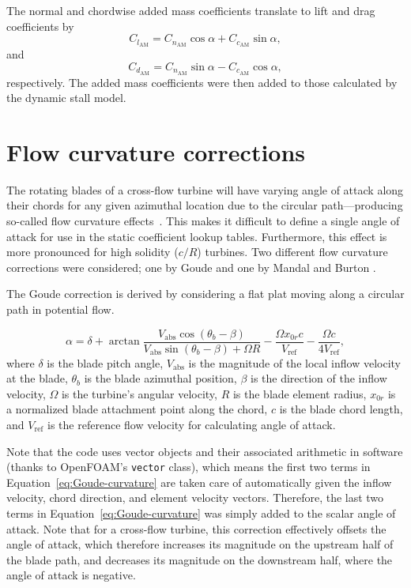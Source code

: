 The normal and chordwise added mass coefficients translate to lift and drag
coefficients by
\begin{equation}
    C_{l_\mathrm{AM}} = C_{n_\mathrm{AM}} \cos \alpha + C_{c_\mathrm{AM}} \sin
    \alpha,
\end{equation}
and
\begin{equation}
    C_{d_\mathrm{AM}} = C_{n_\mathrm{AM}} \sin \alpha - C_{c_\mathrm{AM}} \cos
    \alpha,
\end{equation}
respectively. The added mass coefficients were then added to those calculated by
the dynamic stall model.


\section{Flow curvature corrections}

The rotating blades of a cross-flow turbine will have varying angle of attack
along their chords for any given azimuthal location due to the circular
path---producing so-called flow curvature effects~\cite{Migliore1980}. This
makes it difficult to define a single angle of attack for use in the static
coefficient lookup tables. Furthermore, this effect is more pronounced for high
solidity ($c/R$) turbines. Two different flow curvature corrections were
considered; one by Goude \cite{Goude2012} and one by Mandal and Burton
\cite{Mandal1994}.

The Goude correction is derived by considering a flat plat moving along a
circular path in potential flow.

\begin{equation}
    \alpha = \delta + \arctan \frac{V_\mathrm{abs} \cos(\theta_b -
        \beta)}{V_\mathrm{abs} \sin(\theta_b - \beta) + \Omega R} - \frac{\Omega
        x_{0r}c}{V_\mathrm{ref}} - \frac{\Omega c}{4 V_\mathrm{ref}},
    \label{eq:Goude-curvature}
\end{equation}
where $\delta$ is the blade pitch angle, $V_\mathrm{abs}$ is the magnitude of
the local inflow velocity at the blade, $\theta_b$ is the blade azimuthal
position, $\beta$ is the direction of the inflow velocity, $\Omega$ is the
turbine's angular velocity, $R$ is the blade element radius, $x_{0r}$ is a
normalized blade attachment point along the chord, $c$ is the blade chord
length, and $V_\mathrm{ref}$ is the reference flow velocity for calculating
angle of attack.

Note that the code uses vector objects and their associated arithmetic in
software (thanks to OpenFOAM's \texttt{vector} class), which means the first two
terms in Equation~\ref{eq:Goude-curvature} are taken care of automatically given
the inflow velocity, chord direction, and element velocity vectors. Therefore,
the last two terms in Equation~\ref{eq:Goude-curvature} was simply added to the
scalar angle of attack. Note that for a cross-flow turbine, this correction
effectively offsets the angle of attack, which therefore increases its magnitude
on the upstream half of the blade path, and decreases its magnitude on the
downstream half, where the angle of attack is negative.

